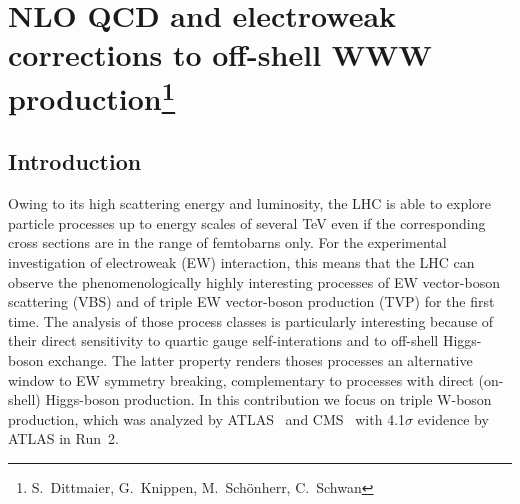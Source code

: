 \newcommand{\Herwig}{H\protect\scalebox{0.8}{ERWIG}\xspace}
\newcommand{\Pythia}{P\protect\scalebox{0.8}{YTHIA}\xspace}
\newcommand{\Sherpa}{S\protect\scalebox{0.8}{HERPA}\xspace}
\newcommand{\Rivet}{R\protect\scalebox{0.8}{IVET}\xspace}
\newcommand{\Recola}{R\protect\scalebox{0.8}{ECOLA}\xspace}
\newcommand{\Amegic}{A\protect\scalebox{0.8}{MEGIC}\xspace}
\newcommand{\Professor}{P\protect\scalebox{0.8}{ROFESSOR}\xspace}
\newcommand{\OpenLoops}{O\protect\scalebox{0.8}{PENLOOPS 2}\xspace}
\newcommand{\Collier}{C\protect\scalebox{0.8}{OLLIER}\xspace}
\newcommand{\Madgraph}{M\protect\scalebox{0.8}{G5\_aMC@NLO}\xspace}
\newcommand{\eps}{\varepsilon}
\newcommand{\mc}[1]{\mathcal{#1}}
\newcommand{\mr}[1]{\mathrm{#1}}
\newcommand{\mb}[1]{\mathbb{#1}}
\newcommand{\tm}[1]{\scalebox{0.95}{$#1$}}
\newcommand{\vp}{\ensuremath{\vphantom{\int_a^b}}}
\newcommand{\vP}{\ensuremath{\vphantom{\int\limits_a^b}}}

\section{NLO QCD and electroweak corrections to off-shell WWW production\protect\footnote{
  S.~Dittmaier,
  G.~Knippen,
  M.~Sch{\"o}nherr,
  C.~Schwan}{}}

\label{sec:WWW}


\subsection{Introduction}
\label{sec:WWW:intro}

Owing to its high scattering energy and luminosity, the LHC is able 
to explore particle processes up to energy scales of several TeV 
even if the corresponding cross sections are in the range of
femtobarns only. 
For the experimental investigation of electroweak (EW) interaction,
this means that the LHC can observe the phenomenologically highly
interesting processes of EW vector-boson scattering (VBS) and
of triple EW vector-boson production (TVP) for the first time.
The analysis of those process classes is particularly interesting
because of their direct sensitivity to quartic gauge self-interations
and to off-shell Higgs-boson exchange. The latter property renders
thoses processes an alternative window to EW symmetry
breaking, complementary to processes with direct (on-shell)
Higgs-boson production.
In this contribution we focus on triple W-boson production, which
was analyzed by ATLAS~\cite{Aaboud:2016ftt,Aad:2019dxu}
and CMS~\cite{CMS:2019mpq} with 4.1$\sigma$ evidence by ATLAS in Run~2.

